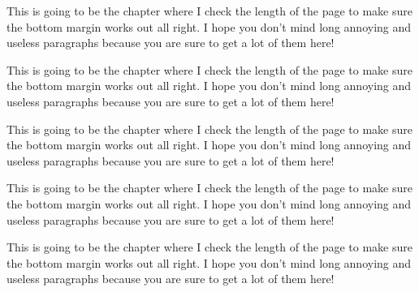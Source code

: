 This is going to be the chapter where I check the length of the page
to make sure the bottom margin works out all right.  I hope you don't
mind long annoying and useless paragraphs because you are sure to get
a lot of them here!

This is going to be the chapter where I check the length of the page
to make sure the bottom margin works out all right.  I hope you don't
mind long annoying and useless paragraphs because you are sure to get
a lot of them here!

This is going to be the chapter where I check the length of the page
to make sure the bottom margin works out all right.  I hope you don't
mind long annoying and useless paragraphs because you are sure to get
a lot of them here!

This is going to be the chapter where I check the length of the page
to make sure the bottom margin works out all right.  I hope you don't
mind long annoying and useless paragraphs because you are sure to get
a lot of them here!

This is going to be the chapter where I check the length of the page
to make sure the bottom margin works out all right.  I hope you don't
mind long annoying and useless paragraphs because you are sure to get
a lot of them here!

